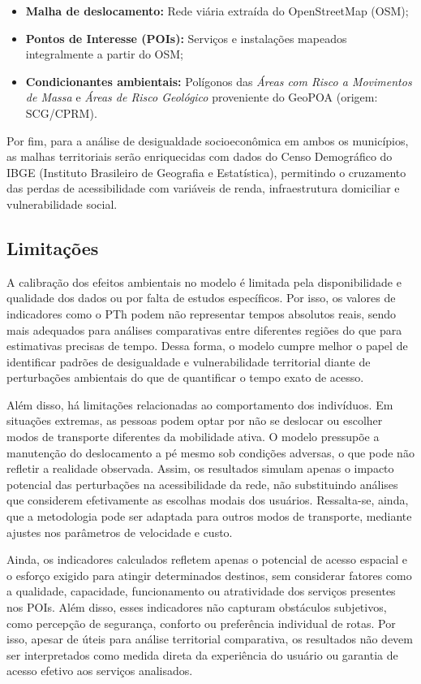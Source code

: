 \begin{itemize}
    \item \textbf{Malha de deslocamento:} Rede viária extraída do OpenStreetMap (OSM);
    \item \textbf{Pontos de Interesse (POIs):} Serviços e instalações mapeados integralmente a partir do OSM;
    \item \textbf{Condicionantes ambientais:} Polígonos das \textit{Áreas com Risco a Movimentos de Massa} e \textit{Áreas de Risco Geológico} proveniente do GeoPOA (origem: SCG/CPRM).
\end{itemize}

Por fim, para a análise de desigualdade socioeconômica em ambos os municípios, as malhas territoriais serão enriquecidas com dados do Censo Demográfico do IBGE (Instituto Brasileiro de Geografia e Estatística), permitindo o cruzamento das perdas de acessibilidade com variáveis de renda, infraestrutura domiciliar e vulnerabilidade social.

\subsection{Limitações}
\label{subsec:limitations}

A calibração dos efeitos ambientais no modelo é limitada pela disponibilidade e qualidade dos dados ou por falta de estudos específicos. Por isso, os valores de indicadores como o PTh podem não representar tempos absolutos reais, sendo mais adequados para análises comparativas entre diferentes regiões do que para estimativas precisas de tempo. Dessa forma, o modelo cumpre melhor o papel de identificar padrões de desigualdade e vulnerabilidade territorial diante de perturbações ambientais do que de quantificar o tempo exato de acesso.

Além disso, há limitações relacionadas ao comportamento dos indivíduos. Em situações extremas, as pessoas podem optar por não se deslocar ou escolher modos de transporte diferentes da mobilidade ativa. O modelo pressupõe a manutenção do deslocamento a pé mesmo sob condições adversas, o que pode não refletir a realidade observada. Assim, os resultados simulam apenas o impacto potencial das perturbações na acessibilidade da rede, não substituindo análises que considerem efetivamente as escolhas modais dos usuários. Ressalta-se, ainda, que a metodologia pode ser adaptada para outros modos de transporte, mediante ajustes nos parâmetros de velocidade e custo.

Ainda, os indicadores calculados refletem apenas o potencial de acesso espacial e o esforço exigido para atingir determinados destinos, sem considerar fatores como a qualidade, capacidade, funcionamento ou atratividade dos serviços presentes nos POIs. Além disso, esses indicadores não capturam obstáculos subjetivos, como percepção de segurança, conforto ou preferência individual de rotas. Por isso, apesar de úteis para análise territorial comparativa, os resultados não devem ser interpretados como medida direta da experiência do usuário ou garantia de acesso efetivo aos serviços analisados.






